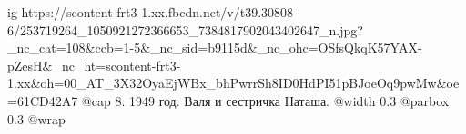  
 
 
 
 

\ifcmt
  ig https://scontent-frt3-1.xx.fbcdn.net/v/t39.30808-6/253719264_1050921272366653_7384817902043402647_n.jpg?_nc_cat=108&ccb=1-5&_nc_sid=b9115d&_nc_ohc=OSfsQkqK57YAX-pZesH&_nc_ht=scontent-frt3-1.xx&oh=00_AT_3X32OyaEjWBx_bhPwrrSh8ID0HdPI51pBJoeOq9pwMw&oe=61CD42A7
  @cap 8. 1949 год. Валя и сестричка Наташа.
  @width 0.3
  @parbox 0.3
  @wrap \parpic[r]
\fi
